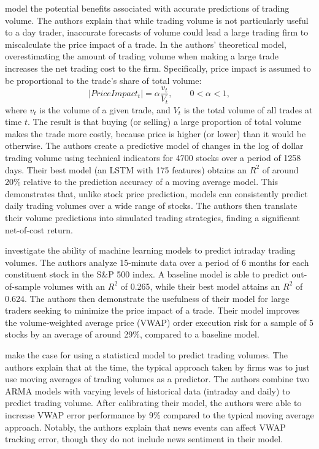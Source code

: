 \documentclass[12pt]{article}
\begin{document}
\textcite{goyenko2024trading} model the potential benefits associated with accurate predictions of trading volume. The authors explain that while trading volume is not particularly useful to a day trader, inaccurate forecasts of volume could lead a large trading firm to miscalculate the price impact of a trade. In the authors' theoretical model, overestimating the amount of trading volume when making a large trade increases the net trading cost to the firm. Specifically, price impact is assumed to be proportional to the trade's share of total volume:
\begin{equation}
    |Price Impact_{t}| = \alpha\frac{v_{t}}{V_{t}}, \qquad 0< \alpha < 1,
\end{equation}
where $v_{t}$ is the volume of a given trade, and $V_{t}$ is the total volume of all trades at time $t$. The result is that buying (or selling) a large proportion of total volume makes the trade more costly, because price is higher (or lower) than it would be otherwise. The authors create a predictive model of changes in the log of dollar trading volume using technical indicators for 4700 stocks over a period of 1258 days. Their best model (an LSTM with 175 features) obtains an $R^2$ of around 20\% relative to the prediction accuracy of a moving average model. This demonstrates that, unlike stock price prediction, models can consistently predict daily trading volumes over a wide range of stocks. The authors then translate their volume predictions into simulated trading strategies, finding a significant net-of-cost return.

\textcite{cucuringu2025forecasting} investigate the ability of machine learning models to predict intraday trading volumes. The authors analyze 15-minute data over a period of 6 months for each constituent stock in the S\&P 500 index. A baseline model is able to predict out-of-sample volumes with an $R^2$ of 0.265, while their best model attains an $R^2$ of 0.624. The authors then demonstrate the usefulness of their model for large traders seeking to minimize the price impact of a trade. Their model improves the volume-weighted average price (VWAP) order execution risk for a sample of 5 stocks by an average of around 29\%, compared to a baseline model.

\textcite{satish2014predicting} make the case for using a statistical model to predict trading volumes. The authors explain that at the time,  the typical approach taken by firms was to just use moving averages of trading volumes as a predictor. The authors combine two ARMA models with varying levels of historical data (intraday and daily) to predict trading volume. After calibrating their model, the authors were able to increase VWAP error performance by 9\% compared to the typical moving average approach. Notably, the authors explain that news events can affect VWAP tracking error, though they do not include news sentiment in their model.
\end{document}
